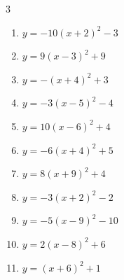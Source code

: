 \begin{multicols}{3}
\begin{enumerate}
        \phantom{$\displaystyle 頂点\left( -7 , -3 \right)$}

  \item $\displaystyle y=-10\left( x+2\right)^{2}-3$

        \phantom{$\displaystyle 頂点\left( -2 , -3 \right)$}

  \item $\displaystyle y=9\left( x-3\right)^{2}+9$

        \phantom{$\displaystyle 頂点\left( 3 , 9 \right)$}

  \item $\displaystyle y=-\left( x+4\right)^{2}+3$

        \phantom{$\displaystyle 頂点\left( -4 , 3 \right)$}

  \item $\displaystyle y=-3\left( x-5\right)^{2}-4$

        \phantom{$\displaystyle 頂点\left( 5 , -4 \right)$}

  \item $\displaystyle y=10\left( x-6\right)^{2}+4$

        \phantom{$\displaystyle 頂点\left( 6 , 4 \right)$}

  \item $\displaystyle y=-6\left( x+4\right)^{2}+5$

        \phantom{$\displaystyle 頂点\left( -4 , 5 \right)$}

  \item $\displaystyle y=8\left( x+9\right)^{2}+4$

        \phantom{$\displaystyle 頂点\left( -9 , 4 \right)$}

  \item $\displaystyle y=-3\left( x+2\right)^{2}-2$

        \phantom{$\displaystyle 頂点\left( -2 , -2 \right)$}

  \item $\displaystyle y=-5\left( x-9\right)^{2}-10$

        \phantom{$\displaystyle 頂点\left( 9 , -10 \right)$}

  \item $\displaystyle y=2\left( x-8\right)^{2}+6$

        \phantom{$\displaystyle 頂点\left( 8 , 6 \right)$}

  \item $\displaystyle y=\left( x+6\right)^{2}+1$

        \phantom{$\displaystyle 頂点\left( -6 , 1 \right)$}


\end{enumerate}
\end{multicols}
